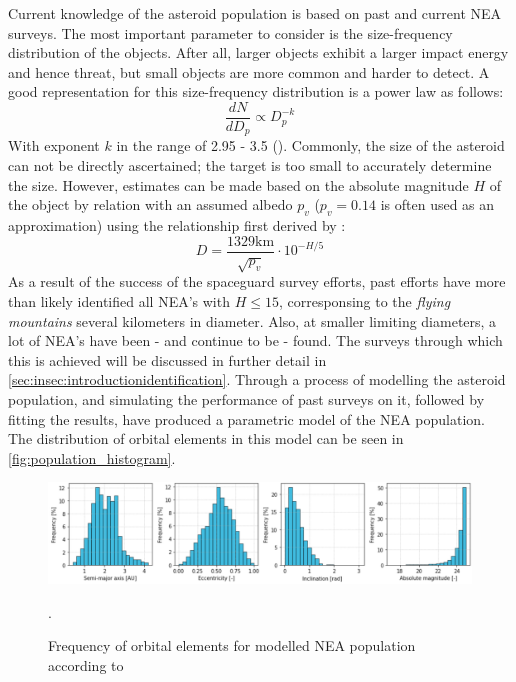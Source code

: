 Current knowledge of the asteroid population is based on past and current NEA surveys. The most important parameter to consider is the size-frequency distribution of the objects. After all, larger objects exhibit a larger impact energy and hence threat, but small objects are more common and harder to detect. A good representation for this size-frequency distribution is a power law as follows:
\begin{equation}
 \frac{dN}{dD_p} \propto D_p^{-k}
 \label{eq:sizefreqlaw}
\end{equation}
With exponent $k$ in the range of 2.95 - 3.5 (\cite{AsteroidSizeFrequency}). Commonly, the size of the asteroid can not be directly ascertained; the target is too small to accurately determine the size. However, estimates can be made based on the absolute magnitude $H$ of the object by relation with an assumed albedo $p_v$ ($p_v = 0.14$ is often used as an approximation) using the relationship first derived by \cite{AsteroidSizeAlbedo}:
\begin{equation}
 D = \frac{1329 \mathrm{km}}{\sqrt{p_v}}\cdot 10^{-H/5}
\end{equation}
As a result of the success of the spaceguard survey efforts, past efforts have more than likely identified all NEA's with $H \leq 15$, corresponsing to the \textit{flying mountains} several kilometers in diameter. Also, at smaller limiting diameters, a lot of NEA's have been - and continue to be - found. The surveys through which this is achieved will be discussed in further detail in \autoref{sec:insec:introductionidentification}. Through a process of modelling the asteroid population, and simulating the performance of past surveys on it, followed by fitting the results, \cite{GranvikPopulation} have produced a parametric model of the NEA population. The distribution of orbital elements in this model can be seen in \autoref{fig:population_histogram}. \\

\begin{figure}[htbp]
 \centering
 \includegraphics[width=1.0\textwidth]{img/population_histogram.png}
 \caption{Frequency of orbital elements for modelled NEA population according to \cite{GranvikPopulation}}.
 \label{fig:population_histogram}
\end{figure}

